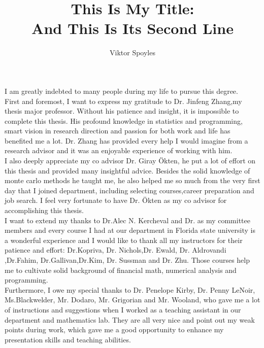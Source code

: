 \documentclass[11pt,expanded,copyright]{fsuthesis}
\title{This Is My Title:\protect\\And This Is Its Second Line}
\author{Viktor Spoyles}
\begin{document}
\frontmatter
\maketitle
\makecommitteepage


\begin{acknowledgments}
I am greatly indebted to many people during my life to pursue this degree.\\

First and foremost, I want to express my gratitude to Dr. Jinfeng Zhang,my thesis major professor. Without his patience and insight, it is impossible to complete this thesis. His profound knowledge in statistics and programming, smart vision in research direction and passion for both work and life has benefited me a lot. Dr. Zhang has provided every help I would imagine from a research advisor and it was an enjoyable experience of working with him.\\

I also deeply appreciate my co advisor Dr. Giray \"{O}kten, he put a lot of effort on this thesis and provided many insightful advice. Besides the solid knowledge of monte carlo methods he taught me, he also helped me so much from the very first day that I joined department, including selecting courses,career preparation and job search. I feel very fortunate to have Dr. \"{O}kten as my co advisor for accomplishing this thesis.\\

I want to extend my thanks to Dr.Alec N. Kercheval and Dr. as my committee members and every course I had at our department in Florida state university is a wonderful experience and I would like to thank all my instructors for their patience and effort: Dr.Kopriva, Dr. Nichols,Dr. Ewald, Dr. Aldrovandi ,Dr.Fahim, Dr.Gallivan,Dr.Kim, Dr. Sussman and Dr. Zhu. Those courses help me to cultivate solid background of financial math, numerical analysis and programming.\\
  
Furthermore, I owe my special thanks to  Dr. Penelope Kirby, Dr. Penny LeNoir, Ms.Blackwelder, Mr. Dodaro, Mr. Grigorian and Mr. Wooland, who gave me a lot of instructions and suggestions when I worked as a teaching assistant in our department and mathematics lab. They are all very nice and point out my weak points during work, which gave me a good opportunity to enhance my presentation skills and teaching abilities.\\


\end{acknowledgments}
\end{document}
